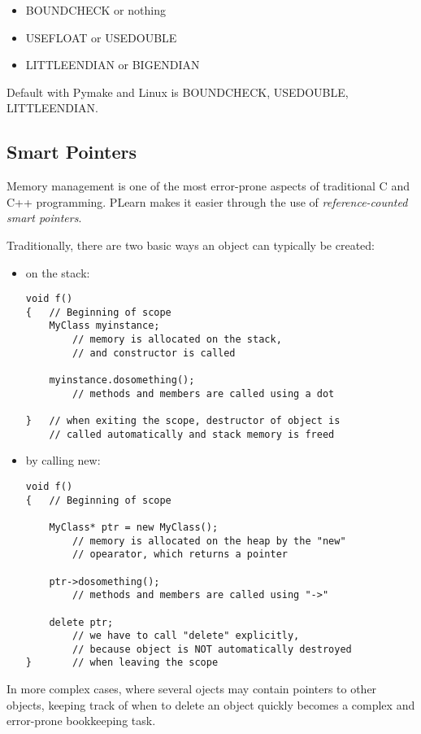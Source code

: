 \documentclass[11pt]{book}
\begin{document}
\begin{itemize}
\item BOUNDCHECK or nothing
\item USEFLOAT or USEDOUBLE
\item LITTLEENDIAN or BIGENDIAN
\end{itemize}
 Default with Pymake and Linux is BOUNDCHECK, USEDOUBLE, \linebreak
LITTLEENDIAN.

\subsection{Smart Pointers}
\label{PP}
 Memory management is one of the most error-prone aspects of traditional
C and C++ programming. PLearn makes it easier through the use of
\emph{reference-counted smart pointers}.

 Traditionally, there are two basic ways an object can typically be created: 

\begin{itemize}
\item  on the stack:
\begin{verbatim}
void f()
{   // Beginning of scope
    MyClass myinstance; 
        // memory is allocated on the stack,
        // and constructor is called

    myinstance.dosomething();
        // methods and members are called using a dot

}   // when exiting the scope, destructor of object is
    // called automatically and stack memory is freed
\end{verbatim}

\item  by calling new:
\begin{verbatim}
void f()
{   // Beginning of scope

    MyClass* ptr = new MyClass(); 
        // memory is allocated on the heap by the "new"
        // opearator, which returns a pointer

    ptr->dosomething(); 
        // methods and members are called using "->"

    delete ptr;
        // we have to call "delete" explicitly,
        // because object is NOT automatically destroyed
}       // when leaving the scope
\end{verbatim}

\end{itemize}

In more complex cases, where several ojects may contain pointers to
other objects, keeping track of when to delete an object quickly becomes
a complex and error-prone bookkeeping task.
\end{document}
